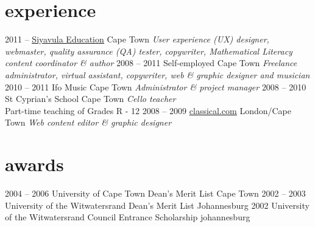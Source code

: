 \documentclass[]{friggeri-cv} %
\begin{document}

\section{experience}

\begin{entrylist}
\entry
{2011 --}
{\href{http://www.siyavula.com}{\underline{Siyavula Education}}}
{Cape Town}
{\emph{User experience (UX) designer, webmaster, quality assurance (QA) tester, copywriter, Mathematical Literacy content coordinator \& author}}
\entry
{2008 -- 2011}
{Self-employed}
{Cape Town}
{\emph{Freelance administrator, virtual assistant, copywriter, web \& graphic designer and musician}}
\entry
{2010 -- 2011}
{Ifo Music}
{Cape Town}
{\emph{Administrator \& project manager}}
\entry
{2008 -- 2010}
{St Cyprian's School}
{Cape Town}
{\emph{Cello teacher} \\
Part-time teaching of Grades R - 12}
\entry
{2008 -- 2009}
{\href{http://www.classical.com}{\underline{classical.com}}}
{London/Cape Town}
{\emph{Web content editor \& graphic designer}}

\end{entrylist}


\section{awards}

\begin{entrylist}
\entry
{2004 -- 2006}
{University of Cape Town Dean's Merit List}
{Cape Town}
{}
\entry
{2002 -- 2003}
{University of the Witwatersrand Dean's Merit List}
{Johannesburg}
{}
\entry
{2002}
{University of the Witwatersrand Council Entrance Scholarship}
{johannesburg}
{}
\end{entrylist}
\end{document}
